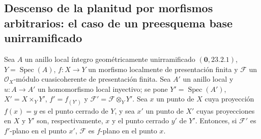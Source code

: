 \subsection{Descenso de la planitud por morfismos arbitrarios: el caso de un preesquema base unirramificado}
\label{subsection:IV.11.6}

\begin{theorem}[11.6.1]
\label{IV.11.6.1}
Sea $A$ un anillo local íntegro geométricamente unirramificado
$(\mathbf 0,23.2.1)$, $Y=\operatorname{Spec}(A)$, $f:X\to Y$ un morfismo localmente de presentación finita y $\mathcal F$ un
$\mathcal O_X$-módulo cuasicoherente de presentación finita. Sea $A'$ un anillo local y $u:A\to A'$ un
homomorfismo local inyectivo; se pone $Y'=\operatorname{Spec}(A')$, $X'=X\times_Y Y'$, $f'=f_{(Y')}$ y $\mathcal F'=\mathcal F\otimes_Y Y'$. Sea $x$
un punto de $X$ cuya proyección $f(x)=y$ es el punto cerrado de $Y$, y sea $x'$ un punto de $X'$ cuyas proyecciones
en $X$ y $Y'$ son, respectivamente, $x$ y el punto cerrado $y'$ de $Y'$. Entonces, si $\mathcal F'$ es $f'$-plano en el punto $x'$,
$\mathcal F$ es $f$-plano en el punto $x$.
\end{theorem}

